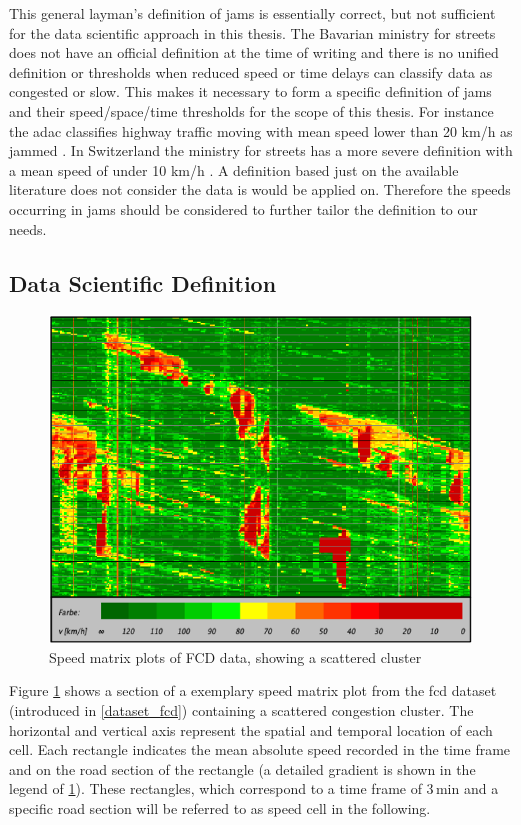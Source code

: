 This general layman's definition of jams is essentially correct, but not sufficient for the data scientific approach in this thesis. The Bavarian ministry for streets does not have an official definition at the time of writing and there is no unified definition or thresholds when reduced speed or time delays can classify data as congested or slow. This makes it necessary to form a specific definition of jams and their speed/space/time thresholds for the scope of this thesis. For instance the \acrshort{adac} classifies highway traffic moving with mean speed lower than 20 km/h as jammed \parencite{ADAC2019}. In Switzerland the ministry for streets has a more severe definition with a mean speed of under 10 km/h \parencite{ASTRA2020}. A definition based just on the available literature does not consider the data is would be applied on. Therefore the speeds occurring in jams should be considered to further tailor the definition to our needs.

\subsection{Data Scientific Definition}

\begin{figure}[ht]
	\centering
	\includegraphics[scale=0.8]{images/SpeedMatrixPlot_single}
	\caption{Speed matrix plots of FCD data, showing a scattered cluster}
	\label{img:speedMatrixPlot_singleCluster}
\end{figure}

Figure \ref{img:speedMatrixPlot_singleCluster} shows a section of a exemplary speed matrix plot from the \acrshort{fcd} dataset (introduced in \cref{dataset_fcd}) containing a scattered congestion cluster. The horizontal and vertical axis represent the spatial and temporal location of each cell. Each rectangle indicates the mean absolute speed recorded in the time frame and on the road section of the rectangle (a detailed gradient is shown in the legend of \cref{img:speedMatrixPlot_singleCluster}). These rectangles, which correspond to a time frame of 3\,min and a specific road section will be referred to as speed cell in the following.

